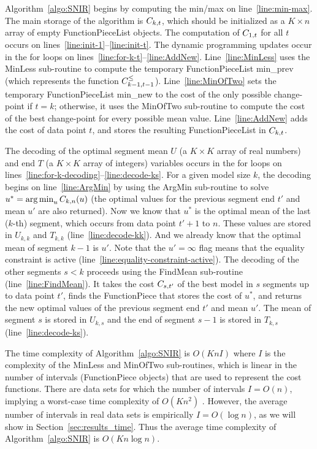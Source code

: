 \documentclass{article}
\DeclareMathOperator*{\argmin}{arg\,min}
\begin{document}
Algorithm~\ref{algo:SNIR} begins by computing the min/max on
line~\ref{line:min-max}.  The main storage of the algorithm is
$C_{k,t}$, which should be initialized as a $K\times n$ array of
empty FunctionPieceList objects. The computation of $C_{1,t}$ for
all $t$ occurs on lines~\ref{line:init-1}--\ref{line:init-t}. 
The dynamic programming updates occur in the for loops on
lines~\ref{line:for-k-t}--\ref{line:AddNew}. Line~\ref{line:MinLess}
uses the MinLess sub-routine to compute the temporary
FunctionPieceList min\_prev (which represents the function
$C_{k-1,t-1}^\leq$). Line~\ref{line:MinOfTwo} sets the temporary
FunctionPieceList min\_new to the cost of the only possible
change-point if $t=k$; otherwise, it uses the MinOfTwo sub-routine to
compute the cost of the best change-point for every possible mean
value. Line~\ref{line:AddNew} adds the cost of data point $t$, and
stores the resulting FunctionPieceList in $C_{k,t}$.

The decoding of the optimal segment mean $U$ (a $K\times K$ array of
real numbers) and end $T$ (a $K\times K$ array of integers) variables
occurs in the for loops on
lines~\ref{line:for-k-decoding}--\ref{line:decode-ks}. For a given
model size $k$, the decoding begins on line~\ref{line:ArgMin} by using
the ArgMin sub-routine to solve $u^* = \argmin_u \FCC_{k,n}(u)$ (the
optimal values for the previous segment end $t'$ and mean $u'$ are
also returned). Now we know that $u^*$ is the optimal mean of the last
($k$-th) segment, which occurs from data point $t'+1$ to $n$. These
values are stored in $U_{k,k}$ and $T_{k,k}$
(line~\ref{line:decode-kk}). And we already know that the optimal mean
of segment $k-1$ is $u'$.  Note that the $u'=\infty$ flag means that
the equality constraint is active
(line~\ref{line:equality-constraint-active}). The decoding of the
other segments $s<k$ proceeds using the FindMean sub-routine
(line~\ref{line:FindMean}). It takes the cost $C_{s,t'}$ of the
best model in $s$ segments up to data point $t'$, finds the
FunctionPiece that stores the cost of $u^*$, and returns the new
optimal values of the previous segment end $t'$ and mean $u'$. The
mean of segment $s$ is stored in $U_{k,s}$ and the end of segment
$s-1$ is stored in $T_{k,s}$ (line~\ref{line:decode-ks}).

The time complexity of Algorithm~\ref{algo:SNIR} is $O(K n I)$ where
$I$ is the complexity of the MinLess and MinOfTwo sub-routines, which
is linear in the number of intervals (FunctionPiece objects) that are
used to represent the cost functions. There are data sets for which
the number of intervals $I=O(n)$, implying a worst-case time complexity of $O(K n^2)$
\citep{pruned-dp-new}. However, the average number of intervals in real
data sets is empirically $I=O(\log n)$, as we will show in
Section~\ref{sec:results_time}. Thus the average time complexity of
Algorithm~\ref{algo:SNIR} is $O(K n \log n)$.
\end{document}
